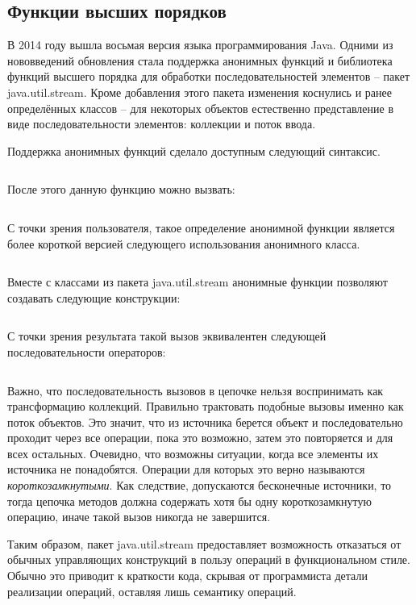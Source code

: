 \subsection{Функции высших порядков} %
В 2014 году вышла восьмая версия языка программирования Java. Одними из нововведений обновления 
стала поддержка анонимных функций и библиотека функций высшего порядка для обработки 
последовательностей элементов -- пакет java.util.stream. Кроме добавления этого пакета 
изменения коснулись и ранее определённых классов -- для некоторых объектов естественно 
представление в виде последовательности элементов: коллекции и поток ввода.

Поддержка анонимных функций сделало доступным следующий синтаксис.
\inputminted{java}{chapter1/code/Lambda.java}

После этого данную функцию можно вызвать:
\inputminted{java}{chapter1/code/UseLambda.java}

С точки зрения пользователя, такое определение анонимной функции является более короткой версией следующего использования анонимного класса.

\inputminted{java}{chapter1/code/SameAnonymous.java}

Вместе с классами из пакета java.util.stream анонимные функции позволяют создавать следующие конструкции:

\inputminted{java}{chapter1/code/StreamUsage.java}

С точки зрения результата такой вызов эквивалентен следующей последовательности операторов: 

\inputminted{java}{chapter1/code/CyclesUsage.java}

Важно, что последовательность вызовов в цепочке нельзя воспринимать как трансформацию коллекций. Правильно трактовать подобные вызовы именно как поток объектов. Это значит, что из источника берется объект и последовательно проходит через все операции, пока это возможно, затем это повторяется и для всех остальных. Очевидно, что возможны ситуации, когда все элементы их источника не понадобятся. Операции для которых это верно называются \textit{короткозамкнутыми}. Как следствие, допускаются бесконечные источники, то тогда цепочка методов должна содержать хотя бы одну короткозамкнутую операцию, иначе такой вызов никогда не завершится.

Таким образом, пакет java.util.stream предоставляет возможность отказаться от обычных управляющих конструкций в пользу операций в функциональном стиле. Обычно это приводит к краткости кода, скрывая от программиста детали реализации операций, оставляя лишь семантику операций.

